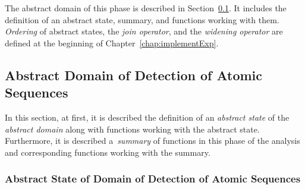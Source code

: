 The abstract domain of this phase is described in
Section~\ref{sec:implementPhase1Domain}. It includes the definition of
an abstract state, summary, and functions working with them.
\emph{Ordering} of abstract states, the \emph{join operator}, and
the \emph{widening operator} are defined at the beginning of
Chapter~\ref{chap:implementExp}.


\subsection{Abstract Domain of Detection of Atomic Sequences}
\label{sec:implementPhase1Domain}

In this section, at first, it is described the definition of an
\emph{abstract state} of the \emph{abstract domain} along with functions
working with the abstract state. Furthermore, it is described
a~\emph{summary} of functions in this phase of the analysis and
corresponding functions working with the summary.

\subsubsection{Abstract State of Domain of Detection of Atomic Sequences}

